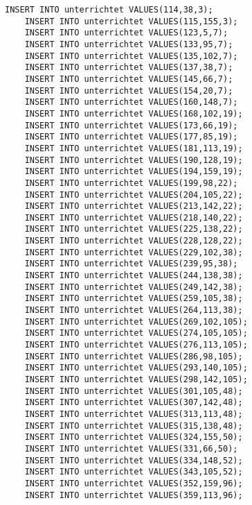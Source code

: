 \begin{lstlisting}[breaklines=True, numbers=none, basicstyle=\tiny, keepspaces=false]
	INSERT INTO unterrichtet VALUES(114,38,3);
	INSERT INTO unterrichtet VALUES(115,155,3);
	INSERT INTO unterrichtet VALUES(123,5,7);
	INSERT INTO unterrichtet VALUES(133,95,7);
	INSERT INTO unterrichtet VALUES(135,102,7);
	INSERT INTO unterrichtet VALUES(137,38,7);
	INSERT INTO unterrichtet VALUES(145,66,7);
	INSERT INTO unterrichtet VALUES(154,20,7);
	INSERT INTO unterrichtet VALUES(160,148,7);
	INSERT INTO unterrichtet VALUES(168,102,19);
	INSERT INTO unterrichtet VALUES(173,66,19);
	INSERT INTO unterrichtet VALUES(177,85,19);
	INSERT INTO unterrichtet VALUES(181,113,19);
	INSERT INTO unterrichtet VALUES(190,128,19);
	INSERT INTO unterrichtet VALUES(194,159,19);
	INSERT INTO unterrichtet VALUES(199,98,22);
	INSERT INTO unterrichtet VALUES(204,105,22);
	INSERT INTO unterrichtet VALUES(213,142,22);
	INSERT INTO unterrichtet VALUES(218,140,22);
	INSERT INTO unterrichtet VALUES(225,138,22);
	INSERT INTO unterrichtet VALUES(228,128,22);
	INSERT INTO unterrichtet VALUES(229,102,38);
	INSERT INTO unterrichtet VALUES(239,95,38);
	INSERT INTO unterrichtet VALUES(244,138,38);
	INSERT INTO unterrichtet VALUES(249,142,38);
	INSERT INTO unterrichtet VALUES(259,105,38);
	INSERT INTO unterrichtet VALUES(264,113,38);
	INSERT INTO unterrichtet VALUES(269,102,105);
	INSERT INTO unterrichtet VALUES(274,105,105);
	INSERT INTO unterrichtet VALUES(276,113,105);
	INSERT INTO unterrichtet VALUES(286,98,105);
	INSERT INTO unterrichtet VALUES(293,140,105);
	INSERT INTO unterrichtet VALUES(298,142,105);
	INSERT INTO unterrichtet VALUES(301,105,48);
	INSERT INTO unterrichtet VALUES(307,142,48);
	INSERT INTO unterrichtet VALUES(313,113,48);
	INSERT INTO unterrichtet VALUES(315,138,48);
	INSERT INTO unterrichtet VALUES(324,155,50);
	INSERT INTO unterrichtet VALUES(331,66,50);
	INSERT INTO unterrichtet VALUES(334,148,52);
	INSERT INTO unterrichtet VALUES(343,105,52);
	INSERT INTO unterrichtet VALUES(352,159,96);
	INSERT INTO unterrichtet VALUES(359,113,96);
\end{lstlisting}